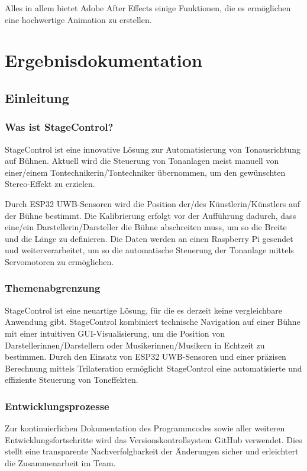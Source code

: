 Alles in allem bietet Adobe After Effects einige Funktionen, die es ermöglichen eine hochwertige Animation zu erstellen.


\chapter{Ergebnisdokumentation}
\section{Einleitung}
\subsection{Was ist StageControl?}
StageControl ist eine innovative Lösung zur Automatisierung von Tonausrichtung auf Bühnen. Aktuell wird die Steuerung von Tonanlagen meist manuell von einer/einem Tontechnikerin/Tontechniker übernommen, um den gewünschten Stereo-Effekt zu erzielen.

Durch ESP32 UWB-Sensoren wird die Position der/des Künstlerin/Künstlers auf der Bühne bestimmt. Die Kalibrierung erfolgt vor der Aufführung dadurch, dass eine/ein Darstellerin/Darsteller die Bühne abschreiten muss, um so die Breite und die Länge zu definieren. Die Daten werden an einen Raspberry Pi gesendet und weiterverarbeitet, um so die automatische Steuerung der Tonanlage mittels Servomotoren zu ermöglichen.

\subsection{Themenabgrenzung}
StageControl ist eine neuartige Lösung, für die es derzeit keine vergleichbare Anwendung gibt. StageControl kombiniert technische Navigation auf einer Bühne mit einer intuitiven GUI-Visualisierung, um die Position von Darstellerinnen/Darstellern oder Musikerinnen/Musikern in Echtzeit zu bestimmen. Durch den Einsatz von ESP32 UWB-Sensoren und einer präzisen Berechnung mittels Trilateration ermöglicht StageControl eine automatisierte und effiziente Steuerung von Toneffekten.

\subsection{Entwicklungsprozesse}  
Zur kontinuierlichen Dokumentation des Programmcodes sowie aller weiteren Entwicklungsfortschritte wird das Versionskontrollsystem GitHub verwendet. Dies stellt eine transparente Nachverfolgbarkeit der Änderungen sicher und erleichtert die Zusammenarbeit im Team.

